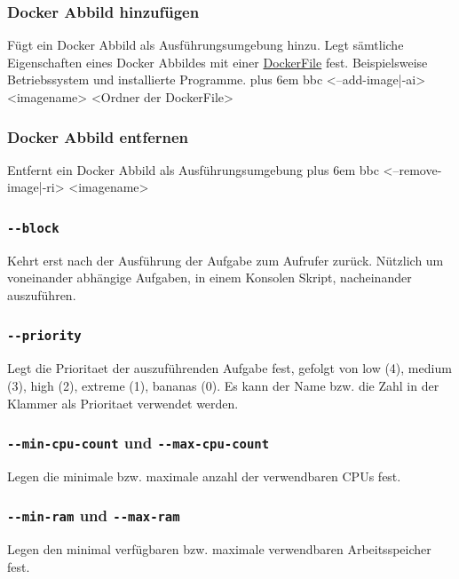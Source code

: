 \documentclass[a4paper,12pt]{article}
\makeatletter
\newenvironment{mycode}
 {\def\@xobeysp{\ }\verbatim\rightskip=0pt plus 6em\relax}
 {\endverbatim}
\makeatother
\begin{document}
\subsubsection{Docker Abbild hinzufügen}
Fügt ein Docker Abbild als Ausführungsumgebung hinzu.
Legt sämtliche Eigenschaften eines Docker Abbildes mit einer \href{https://docs.docker.com/engine/reference/builder/}{DockerFile} fest.
Beispielsweise Betriebssystem und installierte Programme. 
\begin{mycode}
bbc <--add-image|-ai> <imagename> <Ordner der DockerFile>
\end{mycode}

\subsubsection{Docker Abbild entfernen}
Entfernt ein Docker Abbild als Ausführungsumgebung
\begin{mycode}
bbc <--remove-image|-ri> <imagename>
\end{mycode}

\subsubsection{\texttt{-{}-block}}
Kehrt erst nach der Ausführung der Aufgabe zum Aufrufer zurück. Nützlich um voneinander abhängige Aufgaben, in einem Konsolen Skript, nacheinander auszuführen.

\subsubsection{\texttt{-{}-priority}}
Legt die \gls{Prioritaet} der auszuführenden Aufgabe fest, gefolgt von low (4), medium (3), high (2), extreme (1), bananas (0).
Es kann der Name bzw. die Zahl in der Klammer als \gls{Prioritaet} verwendet werden.

\subsubsection{\texttt{-{}-min-cpu-count} und \texttt{-{}-max-cpu-count}}
Legen die minimale bzw. maximale anzahl der verwendbaren \glspl{CPU} fest.

\subsubsection{\texttt{-{}-min-ram} und \texttt{-{}-max-ram}}
Legen den minimal verfügbaren bzw. maximale verwendbaren Arbeitsspeicher fest.
\end{document}
